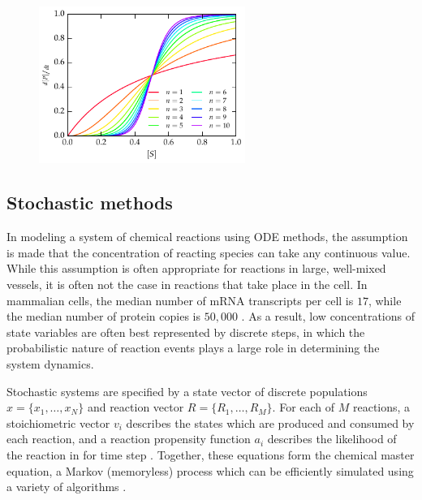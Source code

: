 \begin{figure}[tbp]
  \begin{center}
    \includegraphics[width=0.6\textwidth]{chap1/figures/hilleq.pdf}
  \end{center}
  \label{fig:hillshapes}
\end{figure}


\subsection{Stochastic methods}\label{sec:stoch}

In modeling a system of chemical reactions using ODE methods, the assumption is made that the concentration of reacting species can take any continuous value. 
While this assumption is often appropriate for reactions in large, well-mixed vessels, it is often not the case in reactions that take place in the cell.
In mammalian cells, the median number of mRNA transcripts per cell is $17$, while the median number of protein copies is $50,000$ \cite{Schwanhausser2011}.
As a result, low concentrations of state variables are often best represented by discrete steps, in which the probabilistic nature of reaction events plays a large role in determining the system dynamics.

Stochastic systems are specified by a state vector of discrete populations $x = \{x_1, \ldots, x_N\}$ and reaction vector $R = \{R_1, \ldots, R_M\}$. 
For each of $M$ reactions, a stoichiometric vector $v_i$ describes the states which are produced and consumed by each reaction, and a reaction propensity function $a_i$ describes the likelihood of the reaction in for time step \cite{Gillespie1977}.
Together, these equations form the chemical master equation, a Markov (memoryless) process which can be efficiently simulated using a variety of algorithms \cite{Sanft2011}.


